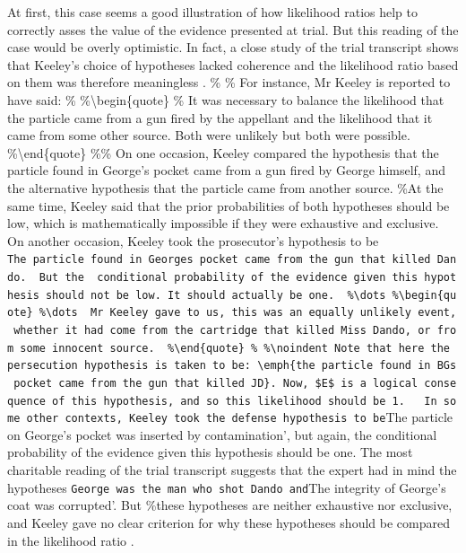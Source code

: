 \documentclass[10pt,dvipsnames,enabledeprecatedfontcommands]{scrartcl}
\begin{document}
At first, this case seems a good illustration of how likelihood ratios
help to correctly asses the value of the evidence presented at trial.
But this reading of the case would be overly optimistic. In fact, a
close study of the trial transcript shows that Keeley's choice of
hypotheses lacked coherence and the likelihood ratio based on them was
therefore meaningless \citep{fenton2014WhenNeutralEvidence}. \% \% For
instance, Mr Keeley is reported to have said: \%
\%\textbackslash{}begin\{quote\} \% It was necessary to balance the
likelihood that the particle came from a gun fired by the appellant and
the likelihood that it came from some other source. Both were unlikely
but both were possible. \%\textbackslash{}end\{quote\} \%\noindent  \%
On one occasion, Keeley compared the hypothesis that the particle found
in George's pocket came from a gun fired by George himself, and the
alternative hypothesis that the particle came from another source. \%At
the same time, Keeley said that the prior probabilities of both
hypotheses should be low, which is mathematically impossible if they
were exhaustive and exclusive.\\
On another occasion, Keeley took the prosecutor's hypothesis to be
\texttt{The\ particle\ found\ in\ George\textquotesingle{}s\ pocket\ came\ from\ the\ gun\ that\ killed\ Dando\textquotesingle{}.\ \ But\ the\ \ conditional\ probability\ of\ the\ evidence\ given\ this\ hypothesis\ should\ not\ be\ low.\ It\ should\ actually\ be\ one.\ \ \%\textbackslash{}dots\ \%\textbackslash{}begin\{quote\}\ \%\textbackslash{}dots\ \ Mr\ Keeley\ gave\ to\ us,\ this\ was\ an\ equally\ unlikely\ event,\ whether\ it\ had\ come\ from\ the\ cartridge\ that\ killed\ Miss\ Dando,\ or\ from\ some\ innocent\ source.\ \ \%\textbackslash{}end\{quote\}\ \%\ \%\textbackslash{}noindent\ Note\ that\ here\ the\ persecution\ hypothesis\ is\ taken\ to\ be:\ \textbackslash{}emph\{the\ particle\ found\ in\ BG\textquotesingle{}s\ pocket\ came\ from\ the\ gun\ that\ killed\ JD\}.\ Now,\ \$E\$\ is\ a\ logical\ consequence\ of\ this\ hypothesis,\ and\ so\ this\ likelihood\ should\ be\ 1.\ \ \ In\ some\ other\ contexts,\ Keeley\ took\ the\ defense\ hypothesis\ to\ be}The
particle on George's pocket was inserted by contamination', but again,
the conditional probability of the evidence given this hypothesis should
be one. The most charitable reading of the trial transcript suggests
that the expert had in mind the hypotheses
\texttt{George\ was\ the\ man\ who\ shot\ Dando\textquotesingle{}\ and}The
integrity of George's coat was corrupted'. But \%these hypotheses are
neither exhaustive nor exclusive, and Keeley gave no clear criterion for
why these hypotheses should be compared in the likelihood ratio
\citep[see][for further details]{fenton2014WhenNeutralEvidence}.
\end{document}
